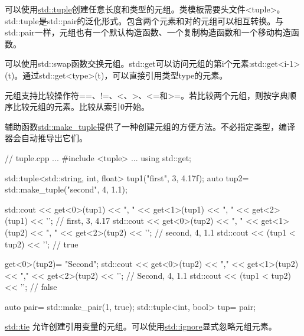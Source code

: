可以使用\href{http://en.cppreference.com/w/cpp/utility/tuple}{std::tuple}创建任意长度和类型的元组。类模板需要头文件<tuple>。std::tuple是std::pair的泛化形式。包含两个元素和对的元组可以相互转换。与std::pair一样，元组也有一个默认构造函数、一个复制构造函数和一个移动构造函数。

可以使用std::swap函数交换元组。std::get可以访问元组的第i个元素:std::get<i-1>(t)。通过std::get<type>(t)，可以直接引用类型type的元素。

元组支持比较操作符==、!=、<、>、<=和>=。若比较两个元组，则按字典顺序比较元组的元素。比较从索引0开始。


辅助函数\href{http://en.cppreference.com/w/cpp/utility/tuple/make_tuple}{std::make\_tuple}提供了一种创建元组的方便方法。不必指定类型，编译器会自动推导出它们。


\begin{cpp}
// tuple.cpp
...
#include <tuple>
...
using std::get;

std::tuple<std::string, int, float> tup1("first", 3, 4.17f);
auto tup2= std::make_tuple("second", 4, 1.1);

std::cout << get<0>(tup1) << ", " << get<1>(tup1) << ", "
		  << get<2>(tup1) << '\n'; // first, 3, 4.17
std::cout << get<0>(tup2) << ", " << get<1>(tup2) << ", "
		  << get<2>(tup2) << '\n'; // second, 4, 1.1
std::cout << (tup1 < tup2) << '\n'; // true

get<0>(tup2)= "Second";
std::cout << get<0>(tup2) << "," << get<1>(tup2) << ","
		  << get<2>(tup2) << '\n'; // Second, 4, 1.1
std::cout << (tup1 < tup2) << '\n'; // false

auto pair= std::make_pair(1, true);
std::tuple<int, bool> tup= pair;
\end{cpp}


\href{http://en.cppreference.com/w/cpp/utility/tuple/tie}{std::tie} 允许创建引用变量的元组。可以使用\href{http://en.cppreference.com/w/cpp/utility/tuple/ignore}{std::ignore}显式忽略元组元素。


